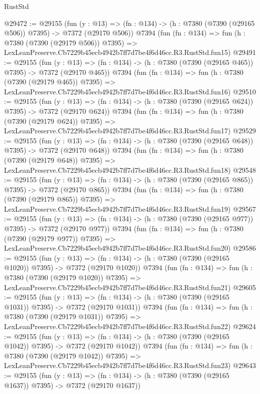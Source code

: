 \begin{lexlean}{RustStd}
\begin{coremodule}
@29472 := @29155
    (fun (y : @13) => (fn : @134) -> (h : @7380 (@7390 (@29165 @506)) @7395) -> @7372 (@29170 @506))
    @7394
    (fun (fn : @134) =>
    fun (h : @7380 (@7390 (@29179 @506)) @7395) =>
    LexLeanPreserve.Cb7229b45ecb4942b7ff7d7be4f6d46cc.R3.RustStd.fun15)
@29491 := @29155
    (fun (y : @13) => (fn : @134) -> (h : @7380 (@7390 (@29165 @465)) @7395) -> @7372 (@29170 @465))
    @7394
    (fun (fn : @134) =>
    fun (h : @7380 (@7390 (@29179 @465)) @7395) =>
    LexLeanPreserve.Cb7229b45ecb4942b7ff7d7be4f6d46cc.R3.RustStd.fun16)
@29510 := @29155
    (fun (y : @13) => (fn : @134) -> (h : @7380 (@7390 (@29165 @624)) @7395) -> @7372 (@29170 @624))
    @7394
    (fun (fn : @134) =>
    fun (h : @7380 (@7390 (@29179 @624)) @7395) =>
    LexLeanPreserve.Cb7229b45ecb4942b7ff7d7be4f6d46cc.R3.RustStd.fun17)
@29529 := @29155
    (fun (y : @13) => (fn : @134) -> (h : @7380 (@7390 (@29165 @648)) @7395) -> @7372 (@29170 @648))
    @7394
    (fun (fn : @134) =>
    fun (h : @7380 (@7390 (@29179 @648)) @7395) =>
    LexLeanPreserve.Cb7229b45ecb4942b7ff7d7be4f6d46cc.R3.RustStd.fun18)
@29548 := @29155
    (fun (y : @13) => (fn : @134) -> (h : @7380 (@7390 (@29165 @865)) @7395) -> @7372 (@29170 @865))
    @7394
    (fun (fn : @134) =>
    fun (h : @7380 (@7390 (@29179 @865)) @7395) =>
    LexLeanPreserve.Cb7229b45ecb4942b7ff7d7be4f6d46cc.R3.RustStd.fun19)
@29567 := @29155
    (fun (y : @13) => (fn : @134) -> (h : @7380 (@7390 (@29165 @977)) @7395) -> @7372 (@29170 @977))
    @7394
    (fun (fn : @134) =>
    fun (h : @7380 (@7390 (@29179 @977)) @7395) =>
    LexLeanPreserve.Cb7229b45ecb4942b7ff7d7be4f6d46cc.R3.RustStd.fun20)
@29586 := @29155
    (fun (y : @13) =>
    (fn : @134) -> (h : @7380 (@7390 (@29165 @1020)) @7395) -> @7372 (@29170 @1020))
    @7394
    (fun (fn : @134) =>
    fun (h : @7380 (@7390 (@29179 @1020)) @7395) =>
    LexLeanPreserve.Cb7229b45ecb4942b7ff7d7be4f6d46cc.R3.RustStd.fun21)
@29605 := @29155
    (fun (y : @13) =>
    (fn : @134) -> (h : @7380 (@7390 (@29165 @1031)) @7395) -> @7372 (@29170 @1031))
    @7394
    (fun (fn : @134) =>
    fun (h : @7380 (@7390 (@29179 @1031)) @7395) =>
    LexLeanPreserve.Cb7229b45ecb4942b7ff7d7be4f6d46cc.R3.RustStd.fun22)
@29624 := @29155
    (fun (y : @13) =>
    (fn : @134) -> (h : @7380 (@7390 (@29165 @1042)) @7395) -> @7372 (@29170 @1042))
    @7394
    (fun (fn : @134) =>
    fun (h : @7380 (@7390 (@29179 @1042)) @7395) =>
    LexLeanPreserve.Cb7229b45ecb4942b7ff7d7be4f6d46cc.R3.RustStd.fun23)
@29643 := @29155
    (fun (y : @13) =>
    (fn : @134) -> (h : @7380 (@7390 (@29165 @1637)) @7395) -> @7372 (@29170 @1637))

\end{coremodule}
\end{lexlean}
